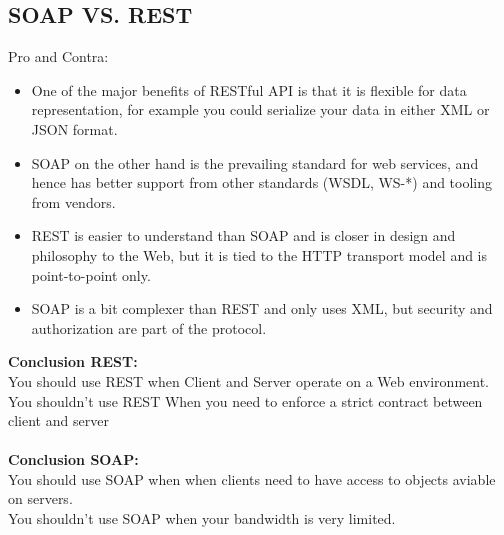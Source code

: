 \documentclass[12pt]{article}
\begin{document}
\subsection{SOAP VS. REST}
Pro and Contra:\\ 
\begin{itemize}
\item One of the major benefits of RESTful API is that it is flexible for data representation, for example you could serialize your data in either XML or JSON format.
\item SOAP on the other hand is the prevailing standard for web services, and hence has better support from other standards (WSDL, WS-*) and tooling from vendors.
\item REST is easier to understand than SOAP and is closer in design and philosophy to the Web, but it is tied to the HTTP transport model and is point-to-point only.
\item SOAP is a bit complexer than REST and only uses XML, but security and authorization are part of the protocol.
\end{itemize}
\textbf{Conclusion REST:}\\
You should use REST when Client and Server operate on a Web environment.\\
You shouldn't use REST When you need to enforce a strict contract between client and server\\
\\\textbf{Conclusion SOAP:}\\
You should use SOAP when when clients need to have access to objects aviable on servers.\\
You shouldn't use SOAP when your bandwidth is very limited.\\
\end{document}
